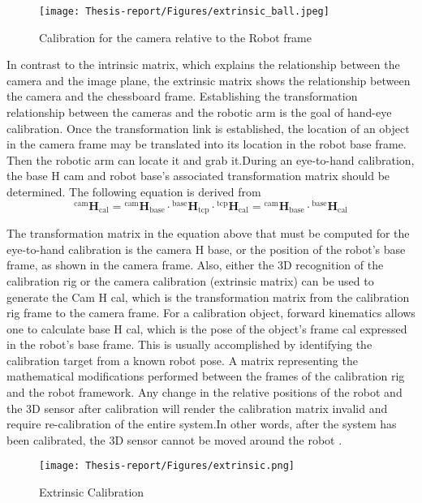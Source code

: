 \documentclass[12pt]{article}
\begin{document}
\begin{figure}[h]
    \centering
    \texttt{[image: Thesis-report/Figures/extrinsic\_ball.jpeg]}
    \caption{Calibration for the camera relative to the Robot frame}
    \label{fig:Photoneo Cmaera}
\end{figure}
In contrast to the intrinsic matrix, which explains the relationship between the camera and the image plane, the extrinsic matrix shows the relationship between the camera and the chessboard frame. Establishing the transformation relationship between the cameras and the robotic arm is the goal of hand-eye calibration.  Once the transformation link is established, the location of an object in the camera frame may be translated into its location in the robot base frame. Then the robotic arm can locate it and grab it.During an eye-to-hand calibration, the base H cam and robot base's associated transformation matrix should be determined\cite{ref3}.  The following equation is derived from\\

 \[
{}^{\text{cam}}\mathbf{H}_{\text{cal}} = {}^{\text{cam}}\mathbf{H}_{\text{base}} \cdot {}^{\text{base}}\mathbf{H}_{\text{tcp}} \cdot {}^{\text{tcp}}\mathbf{H}_{\text{cal}} = {}^{\text{cam}}\mathbf{H}_{\text{base}} \cdot {}^{\text{base}}\mathbf{H}_{\text{cal}} \tag{3}
\]


The transformation matrix in the equation above that must be computed for the eye-to-hand calibration is the camera H base, or the position of the robot's base frame, as shown in the camera frame. Also, either the 3D recognition of the calibration rig or the camera calibration (extrinsic matrix) can be used to generate the Cam H cal, which is the transformation matrix from the calibration rig frame to the camera frame.   For a calibration object, forward kinematics allows one to calculate base H cal, which is the pose of the object's frame cal expressed in the robot's base frame. This is usually accomplished by identifying the calibration target from a known robot pose. A matrix representing the mathematical modifications performed between the frames of the calibration rig and the robot framework.  Any change in the relative positions of the robot and the 3D sensor after calibration will render the calibration matrix invalid and require re-calibration of the entire system.In other words, after the system has been calibrated, the 3D sensor cannot be moved around the robot \cite{ref3}.\\


\begin{figure}[h]
    \centering
    \texttt{[image: Thesis-report/Figures/extrinsic.png]}
    \caption{Extrinsic Calibration \cite{ref2} } 
    \label{fig:Photoneo Cmaera}
\end{figure}
\end{document}
